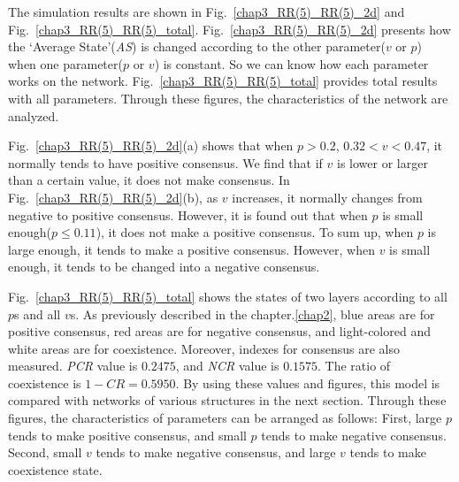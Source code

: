 The simulation results are shown in Fig.~\ref{chap3_RR(5)_RR(5)_2d} and Fig.~\ref{chap3_RR(5)_RR(5)_total}.  Fig.~\ref{chap3_RR(5)_RR(5)_2d} presents how the `Average State'(\textit{AS}) is changed according to the other parameter($v$ or $p$) when one parameter($p$ or $v$) is constant. So we can know how each parameter works on the network. Fig.~\ref{chap3_RR(5)_RR(5)_total} provides total results with all parameters. Through these figures, the characteristics of the network are analyzed.

Fig.~\ref{chap3_RR(5)_RR(5)_2d}(a) shows that when $p > 0.2$, $0.32 < v < 0.47$, it normally tends to have positive consensus. We find that if $v$ is lower or larger than a certain value, it does not make consensus. In Fig.~\ref{chap3_RR(5)_RR(5)_2d}(b), as $v$ increases, it normally changes from negative to positive consensus. However, it is found out that when $p$ is small enough($p \le 0.11$), it does not make a positive consensus.  To sum up, when $p$ is large enough, it tends to make a positive consensus. However, when $v$ is small enough, it tends to be changed into a negative consensus.

Fig.~\ref{chap3_RR(5)_RR(5)_total} shows the states of two layers according to all $p$s and all $v$s. As previously described in the chapter.\ref{chap2}, blue areas are for positive consensus, red areas are for negative consensus, and light-colored and white areas are for coexistence. Moreover, indexes for consensus are also measured. \textit{PCR} value is $0.2475$, and \textit{NCR} value is $0.1575$. The ratio of coexistence is $1 - CR = 0.5950$. By using these values and figures, this model is compared with networks of various structures in the next section. Through these figures, the characteristics of parameters can be arranged as follows: First, large $p$ tends to make positive consensus, and small $p$ tends to make negative consensus. Second, small $v$ tends to make negative consensus, and large $v$ tends to make coexistence state. \\

